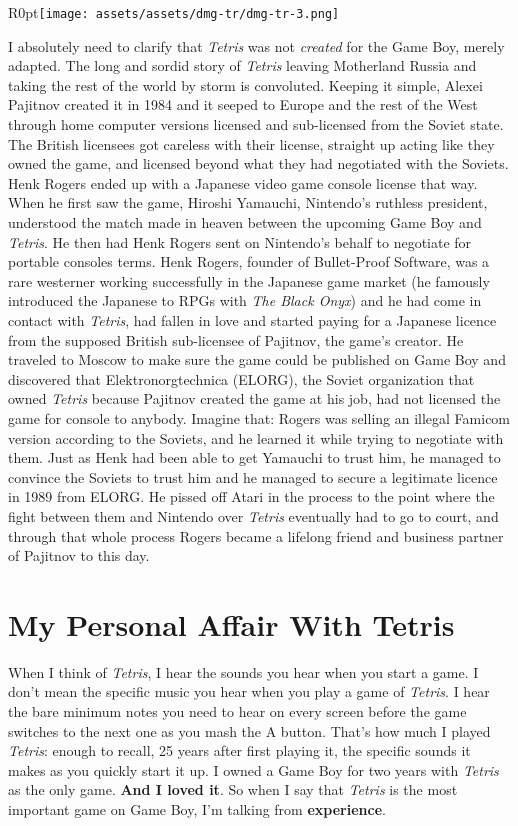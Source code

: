 \documentclass{book}
\begin{document}
\begin{wrapfigure}{R}{0pt}{\texttt{[image: assets/assets/dmg-tr/dmg-tr-3.png]}}\end{wrapfigure}
I absolutely need to clarify that \emph{Tetris} was not \emph{created} for the Game Boy, merely adapted. The long and sordid story of \emph{Tetris} leaving Motherland Russia and taking the rest of the world by storm is convoluted. Keeping it simple, Alexei Pajitnov created it in 1984 and it seeped to Europe and the rest of the West through home computer versions licensed and sub-licensed from the Soviet state. The British licensees got careless with their license, straight up acting like they owned the game, and licensed beyond what they had negotiated with the Soviets. Henk Rogers ended up with a Japanese video game console license that way. When he first saw the game, Hiroshi Yamauchi, Nintendo’s ruthless president, understood the match made in heaven between the upcoming Game Boy and \emph{Tetris}. He then had Henk Rogers sent on Nintendo’s behalf to negotiate for portable consoles terms. Henk Rogers, founder of Bullet-Proof Software, was a rare westerner working successfully in the Japanese game market (he famously introduced the Japanese to RPGs with \emph{The Black Onyx}) and he had come in contact with \emph{Tetris}, had fallen in love and started paying for a Japanese licence from the supposed British sub-licensee of Pajitnov, the game’s creator. He traveled to Moscow to make sure the game could be published on Game Boy and discovered that Elektronorgtechnica (ELORG), the Soviet organization that owned \emph{Tetris} because Pajitnov created the game at his job, had not licensed the game for console to anybody. Imagine that: Rogers was selling an illegal Famicom version according to the Soviets, and he learned it while trying to negotiate with them. Just as Henk had been able to get Yamauchi to trust him, he managed to convince the Soviets to trust him and he managed to secure a legitimate licence in 1989 from ELORG. He pissed off Atari in the process to the point where the fight between them and Nintendo over \emph{Tetris} eventually had to go to court, and through that whole process Rogers became a lifelong friend and business partner of Pajitnov to this day.\par
\FloatBarrier\section*{My Personal Affair With Tetris}
When I think of \emph{Tetris}, I hear the sounds you hear when you start a game. I don’t mean the specific music you hear when you play a game of \emph{Tetris}. I hear the bare minimum notes you need to hear on every screen before the game switches to the next one as you mash the A button. That’s how much I played \emph{Tetris}: enough to recall, 25 years after first playing it, the specific sounds it makes as you quickly start it up. I owned a Game Boy for two years with \emph{Tetris} as the only game. \textbf{And I loved it}. So when I say that \emph{Tetris} is the most important game on Game Boy, I’m talking from \textbf{experience}.\par
\end{document}

